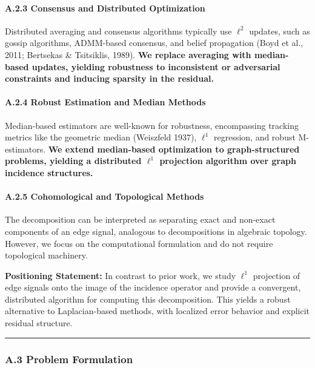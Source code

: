 \documentclass[
]{article}
\begin{document}
\paragraph{A.2.3 Consensus and Distributed
Optimization}\label{a.2.3-consensus-and-distributed-optimization}

Distributed averaging and consensus algorithms typically use \(\ell^2\)
updates, such as gossip algorithms, ADMM-based consensus, and belief
propagation (Boyd et al., 2011; Bertsekas \& Tsitsiklis, 1989).
\textbf{We replace averaging with median-based updates, yielding
robustness to inconsistent or adversarial constraints and inducing
sparsity in the residual.}

\paragraph{A.2.4 Robust Estimation and Median
Methods}\label{a.2.4-robust-estimation-and-median-methods}

Median-based estimators are well-known for robustness, encompassing
tracking metrics like the geometric median (Weiszfeld 1937), \(\ell^1\)
regression, and robust M-estimators. \textbf{We extend median-based
optimization to graph-structured problems, yielding a distributed
\(\ell^1\) projection algorithm over graph incidence structures.}

\paragraph{A.2.5 Cohomological and Topological
Methods}\label{a.2.5-cohomological-and-topological-methods}

The decomposition can be interpreted as separating exact and non-exact
components of an edge signal, analogous to decompositions in algebraic
topology. However, we focus on the computational formulation and do not
require topological machinery.

\textbf{Positioning Statement:} In contrast to prior work, we study
\(\ell^1\) projection of edge signals onto the image of the incidence
operator and provide a convergent, distributed algorithm for computing
this decomposition. This yields a robust alternative to Laplacian-based
methods, with localized error behavior and explicit residual structure.

\begin{center}\rule{0.5\linewidth}{0.5pt}\end{center}

\subsubsection{A.3 Problem Formulation}\label{a.3-problem-formulation}
\end{document}
